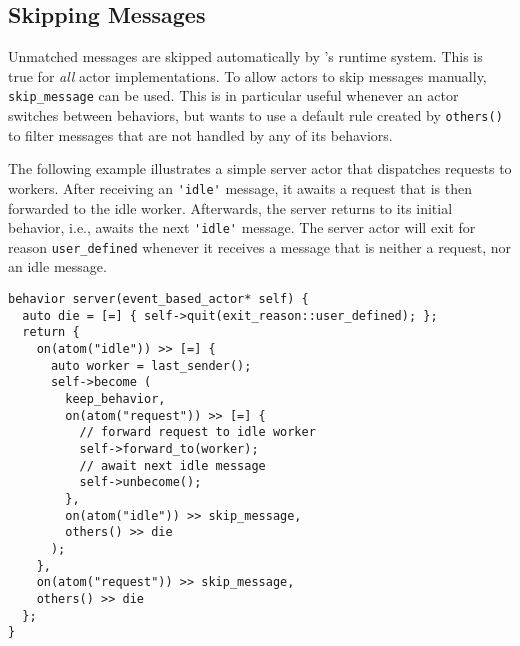 \clearpage
\subsection{Skipping Messages}

Unmatched messages are skipped automatically by \libcppa's runtime system.
This is true for \textit{all} actor implementations.
To allow actors to skip messages manually, \lstinline^skip_message^ can be used.
This is in particular useful whenever an actor switches between behaviors, but wants to use a default rule created by \lstinline^others()^ to filter messages that are not handled by any of its behaviors.

The following example illustrates a simple server actor that dispatches requests to workers.
After receiving an \lstinline^'idle'^ message, it awaits a request that is then forwarded to the idle worker.
Afterwards, the server returns to its initial behavior, i.e., awaits the next \lstinline^'idle'^ message.
The server actor will exit for reason \lstinline^user_defined^ whenever it receives a message that is neither a request, nor an idle message.

\begin{lstlisting}
behavior server(event_based_actor* self) {
  auto die = [=] { self->quit(exit_reason::user_defined); };
  return {
    on(atom("idle")) >> [=] {
      auto worker = last_sender();
      self->become (
        keep_behavior,
        on(atom("request")) >> [=] {
          // forward request to idle worker
          self->forward_to(worker);
          // await next idle message
          self->unbecome();
        },
        on(atom("idle")) >> skip_message,
        others() >> die
      );
    },
    on(atom("request")) >> skip_message,
    others() >> die
  };
}
\end{lstlisting}
